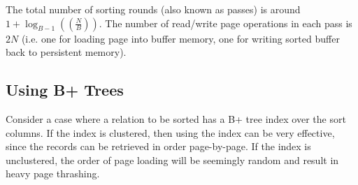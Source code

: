 \documentclass[12pt,titlepage]{article}
\begin{document}
      The total number of sorting rounds (also known as passes) is around $1 + \log_{B-1}((\frac{N}{B}))$. The number of read/write page operations in each
      pass is $2N$ (i.e. one for loading page into buffer memory, one for writing sorted buffer back to persistent memory).

    \subsection{Using B+ Trees}
      Consider a case where a relation to be sorted has a B+ tree index over the sort columns. If the index is clustered, then using the index can be very
      effective, since the records can be retrieved in order page-by-page. If the index is unclustered, the order of page loading will be seemingly random
      and result in heavy page thrashing.
\end{document}
